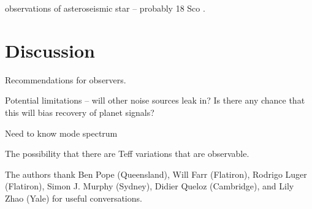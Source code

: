 \documentclass[modern]{aastex62}
\begin{document}
\HARPS observations of asteroseismic star -- probably 18 Sco \citep{Bazot2012}.

\section{Discussion}

Recommendations for observers.

Potential limitations -- will other noise sources leak in? Is there any chance that this will bias recovery of planet signals?

Need to know mode spectrum

The possibility that there are Teff variations that are observable.

\acknowledgements

The authors thank
  Ben Pope (Queensland),
  Will Farr (Flatiron),
  Rodrigo Luger (Flatiron),
  Simon J. Murphy (Sydney),
  Didier Queloz (Cambridge), and
  Lily Zhao (Yale)
for useful conversations.



\clearpage


\end{document}
